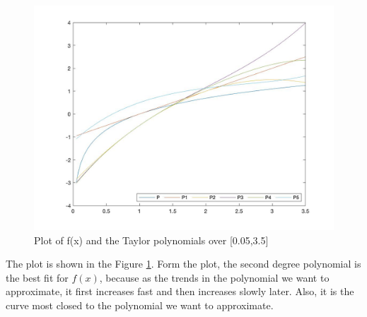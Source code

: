 \begin{answer}
    \begin{figure}[H]
        \centering
        \includegraphics[width=1.0\textwidth]{Figure 4.jpg}
        \caption{\label{fig:fig4}Plot of f(x) and the Taylor polynomials over [0.05,3.5]}
    \end{figure}
    The plot is shown in the Figure \ref{fig:fig4}. Form the plot, the second degree polynomial is the best fit for $f(x)$, because as the trends in the polynomial we want to approximate, it first increases fast and then increases slowly later. Also, it is the curve most closed to the polynomial we want to approximate.
\end{answer}